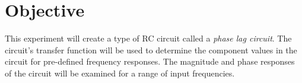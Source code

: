 \section{Objective}\label{sec:objective}
This experiment will create a type of RC circuit called a \emph{phase lag circuit}.
The circuit's transfer function will be used to determine the component values in the circuit for pre-defined frequency responses.
The magnitude and phase responses of the circuit will be examined for a range of input frequencies.
